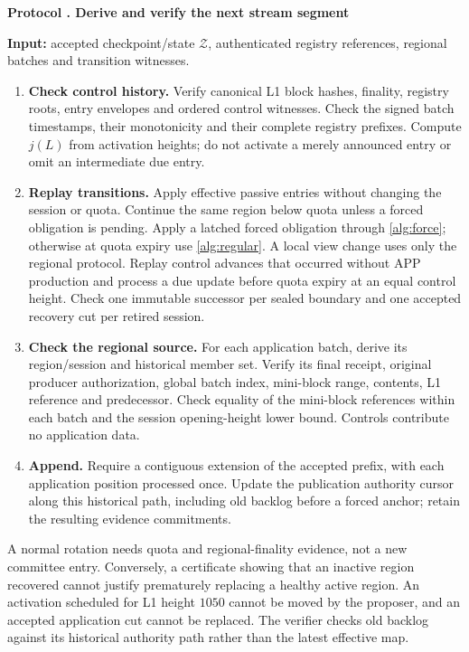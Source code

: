 \documentclass[11pt,a4paper,onecolumn]{article}
\newcounter{protocol}
\newenvironment{protocol}[2]{\refstepcounter{protocol}\label{#1}
\begin{mdframed}[nobreak=true,linewidth=.6pt,skipabove=9pt,skipbelow=9pt,
innertopmargin=7pt,innerbottommargin=7pt]\small
\noindent\textbf{Protocol \theprotocol. #2}\par\smallskip}{\end{mdframed}}
\begin{document}
\begin{protocol}{alg:derive}{Derive and verify the next stream segment}
\textbf{Input:} accepted checkpoint/state $\mathcal Z$, authenticated
registry references, regional batches and transition witnesses.
\begin{enumerate}[label=\textbf{L\arabic*.}]
\item \textbf{Check control history.} Verify canonical L1 block hashes,
finality, registry roots, entry envelopes and ordered control witnesses.
Check the signed batch timestamps, their monotonicity and their complete
registry prefixes. Compute $j(L)$ from activation heights; do not activate
a merely announced entry or omit an intermediate due entry.
\item \textbf{Replay transitions.} Apply effective passive entries without changing
the session or quota. Continue the same region below quota unless a forced
obligation is pending. Apply a latched forced obligation through
\cref{alg:force}; otherwise at quota expiry use \cref{alg:regular}. A local view change uses only
the regional protocol. Replay control advances that occurred without
APP production and process a due update before quota expiry at an equal
control height. Check one immutable successor per sealed boundary and one
accepted recovery cut per retired session.
\item \textbf{Check the regional source.} For each application batch,
derive its region/session and historical member set. Verify its final
receipt, original producer authorization, global batch index, mini-block
range, contents, L1 reference and predecessor. Check equality of the
mini-block references within each batch and the session opening-height
lower bound. Controls contribute no application data.
\item \textbf{Append.} Require a contiguous extension of the accepted
prefix, with each application position processed once. Update the
publication authority cursor along this historical path, including old
backlog before a forced anchor; retain the resulting evidence commitments.
\end{enumerate}
\end{protocol}
A normal rotation needs quota and regional-finality evidence, not a new
committee entry. Conversely, a certificate showing that an inactive region
recovered cannot justify prematurely replacing a healthy active region.
An activation scheduled for L1 height $1050$ cannot be moved by the
proposer, and an accepted application cut cannot be replaced. The verifier
checks old backlog against its historical authority path rather than the
latest effective map.
\end{document}
